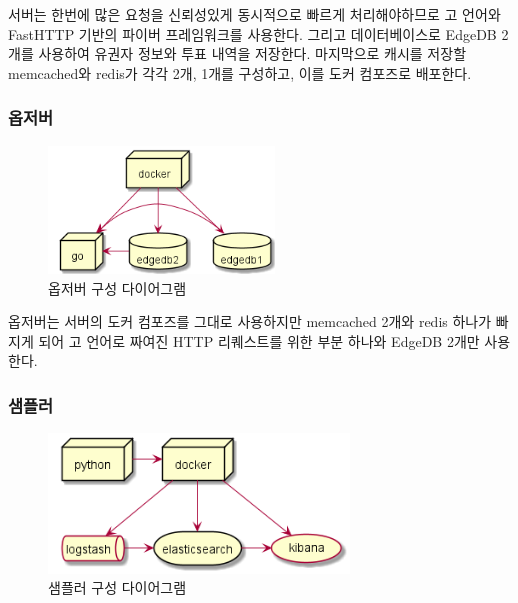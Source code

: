 \documentclass[8pt,a4paper,left=8mm,right=8mm,top=10mm,bottom=10mm]{article}
\begin{document}
    서버는 한번에 많은 요청을 신뢰성있게 동시적으로 빠르게 처리해야하므로 고 언어와 FastHTTP 기반의 파이버 프레임워크를 사용한다. 그리고 데이터베이스로 EdgeDB 2개를 사용하여 유권자 정보와 투표 내역을 저장한다. 마지막으로 캐시를 저장할 memcached와 redis가 각각 2개, 1개를 구성하고, 이를 도커 컴포즈로 배포한다.

    \subsubsection{옵저버}

    \begin{figure}[h]
        \begin{center}
            \includegraphics[width=6cm]{observer-method}
            \caption{옵저버 구성 다이어그램}
        \end{center}
    \end{figure}

    옵저버는 서버의 도커 컴포즈를 그대로 사용하지만 memcached 2개와 redis 하나가 빠지게 되어 고 언어로 짜여진 HTTP 리퀘스트를 위한 부분 하나와 EdgeDB 2개만 사용한다. 

    \subsubsection{샘플러}

    \begin{figure}[h]
        \begin{center}
            \includegraphics[width=8cm]{sampler-method}
            \caption{샘플러 구성 다이어그램}
        \end{center}
    \end{figure}
\end{document}
